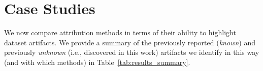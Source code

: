 \documentclass[11pt]{article}
\begin{document}

%

\section{Case Studies}
\label{tab:known-art}

We now compare attribution methods in terms of their ability to highlight dataset artifacts. %
We provide a summary of the previously reported (\textit{known}) and previously \textit{unknown} (i.e., discovered in this work) artifacts we identify in this way (and with which methods) in Table~\ref{tab:results_summary}.
\end{document}

